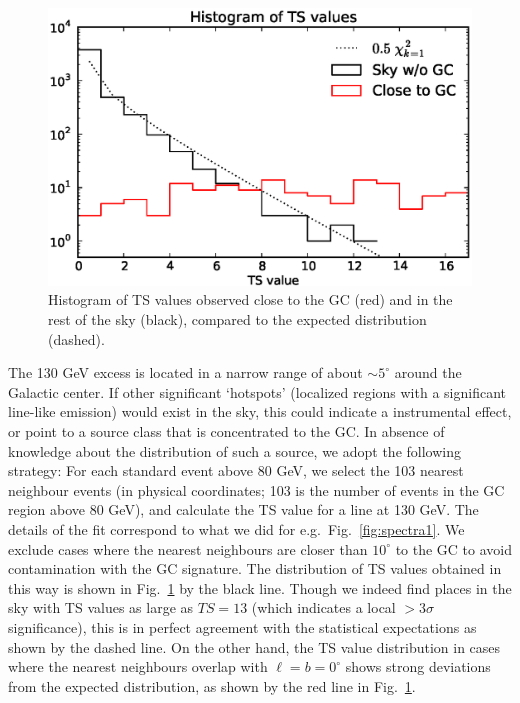 \documentclass[aps,twocolumn,prd,superscriptaddress,showpacs,nofootinbib,fixfloat]{revtex4}
\begin{document}
\begin{figure}
  \begin{center}
    \includegraphics[width=1.0\linewidth]{plots/hotspot_histogram.eps}
  \end{center}
  \caption{Histogram of TS values observed close to the GC (red) and in the
  rest of the sky (black), compared to the expected distribution (dashed).}
  \label{fig:hotspots}
\end{figure}

The 130 GeV excess is located in a narrow range of about $\sim5^\circ$ around
the Galactic center. If other significant `hotspots' (localized regions with a
significant line-like emission) would exist in the sky, this could indicate a
instrumental effect, or point to a source class that is concentrated to the
GC. In absence of knowledge about the distribution of such a source, we adopt
the following strategy: For each standard event above 80 GeV, we select the
103 nearest neighbour events (in physical coordinates; 103 is the number of
events in the GC region above 80 GeV), and calculate the TS value for a line
at 130 GeV. The details of the fit correspond to what we did for
e.g.~Fig.~\ref{fig:spectra1}. We exclude cases where the nearest neighbours
are closer than $10^\circ$ to the GC to avoid contamination with the GC
signature. The distribution of TS values obtained in this way is shown in
Fig.~\ref{fig:hotspots} by the black line. Though we indeed find places in the
sky with TS values as large as $TS=13$ (which indicates a local $>3\sigma$
significance), this is in perfect agreement with the statistical expectations
as shown by the dashed line. On the other hand, the TS value distribution in
cases where the nearest neighbours overlap with $\ell=b=0^\circ$ shows strong
deviations from the expected distribution, as shown by the red line in
Fig.~\ref{fig:hotspots}.
\end{document}
